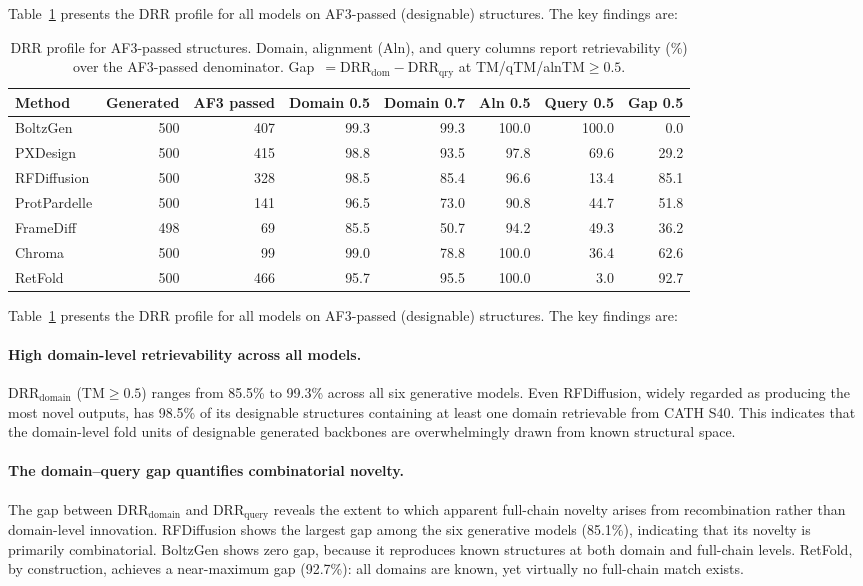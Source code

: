 \documentclass[letterpaper]{article} %
\begin{document}
Table~\ref{tab:drr_passed} presents the DRR profile for all models on AF3-passed (designable) structures. The key findings are:

\begin{table}[t]
\centering
\small
\begin{tabular}{lrrrrrrr}
\toprule
Method & Generated & AF3 passed & Domain 0.5 & Domain 0.7 & Aln 0.5 & Query 0.5 & Gap 0.5 \\
\midrule
BoltzGen & 500 & 407 & 99.3 & 99.3 & 100.0 & 100.0 & 0.0 \\
PXDesign & 500 & 415 & 98.8 & 93.5 & 97.8 & 69.6 & 29.2 \\
RFDiffusion & 500 & 328 & 98.5 & 85.4 & 96.6 & 13.4 & 85.1 \\
ProtPardelle & 500 & 141 & 96.5 & 73.0 & 90.8 & 44.7 & 51.8 \\
FrameDiff & 498 & 69 & 85.5 & 50.7 & 94.2 & 49.3 & 36.2 \\
Chroma & 500 & 99 & 99.0 & 78.8 & 100.0 & 36.4 & 62.6 \\
\midrule
RetFold & 500 & 466 & 95.7 & 95.5 & 100.0 & 3.0 & 92.7 \\
\bottomrule
\end{tabular}
\caption{DRR profile for AF3-passed structures. Domain, alignment (Aln), and query columns report retrievability (\%) over the AF3-passed denominator. Gap~$= \mathrm{DRR_{dom}} - \mathrm{DRR_{qry}}$ at TM/qTM/alnTM${\geq}0.5$.}
\label{tab:drr_passed}
\end{table}

Table~\ref{tab:drr_passed} presents the DRR profile for all models on AF3-passed (designable) structures. The key findings are:

\paragraph{High domain-level retrievability across all models.} $\mathrm{DRR_{domain}}$ (TM${\geq}0.5$) ranges from 85.5\% to 99.3\% across all six generative models. Even RFDiffusion, widely regarded as producing the most novel outputs, has 98.5\% of its designable structures containing at least one domain retrievable from CATH S40. This indicates that the domain-level fold units of designable generated backbones are overwhelmingly drawn from known structural space.

\paragraph{The domain--query gap quantifies combinatorial novelty.} The gap between $\mathrm{DRR_{domain}}$ and $\mathrm{DRR_{query}}$ reveals the extent to which apparent full-chain novelty arises from recombination rather than domain-level innovation. RFDiffusion shows the largest gap among the six generative models (85.1\%), indicating that its novelty is primarily combinatorial. BoltzGen shows zero gap, because it reproduces known structures at both domain and full-chain levels. RetFold, by construction, achieves a near-maximum gap (92.7\%): all domains are known, yet virtually no full-chain match exists.
\end{document}
